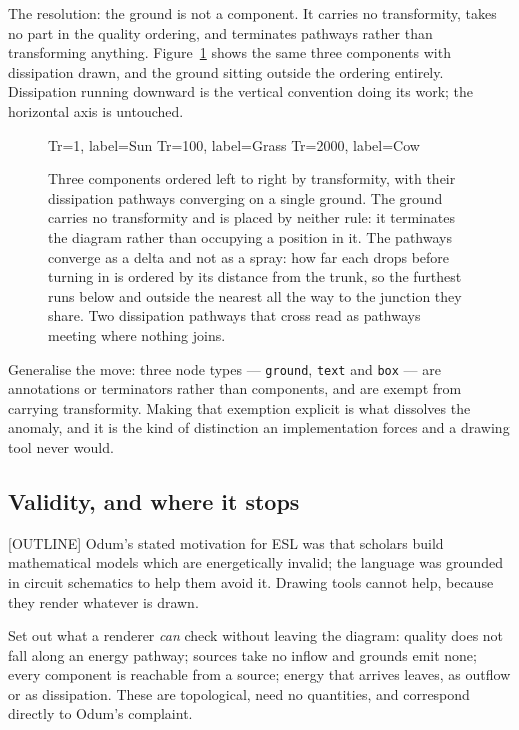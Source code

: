 The resolution: the ground is not a component. It carries no transformity, takes
no part in the quality ordering, and terminates pathways rather than
transforming anything. Figure~\ref{fig:ground} shows the same three components
with dissipation drawn, and the ground sitting outside the ordering entirely.
Dissipation running downward is the vertical convention doing its work; the
horizontal axis is untouched.

\begin{figure}[htbp]
\centering
\begin{energese}[scale=0.85]
         {Tr=1,    label={Sun}}
     {Tr=100,  label={Grass}}
       {Tr=2000, label={Cow}}
\end{energese}
\caption{Three components ordered left to right by transformity, with their
dissipation pathways converging on a single ground. The ground carries no
transformity and is placed by neither rule: it terminates the diagram rather
than occupying a position in it. The pathways converge as a delta and not as a
spray: how far each drops before turning in is ordered by its distance from the
trunk, so the furthest runs below and outside the nearest all the way to the
junction they share. Two dissipation pathways that cross read as pathways
meeting where nothing joins.}
\label{fig:ground}
\end{figure}

Generalise the move: three node types --- \texttt{ground}, \texttt{text} and
\texttt{box} --- are annotations or terminators rather than components, and are
exempt from carrying transformity. Making that exemption explicit is what
dissolves the anomaly, and it is the kind of distinction an implementation
forces and a drawing tool never would.

\subsection{Validity, and where it stops}
\label{sec:validity}

[OUTLINE] Odum's stated motivation for ESL was that scholars build mathematical
models which are energetically invalid; the language was grounded in circuit
schematics to help them avoid it. Drawing tools cannot help, because they render
whatever is drawn.

Set out what a renderer \emph{can} check without leaving the diagram: quality
does not fall along an energy pathway; sources take no inflow and grounds emit
none; every component is reachable from a source; energy that arrives leaves,
as outflow or as dissipation. These are topological, need no quantities, and
correspond directly to Odum's complaint.

